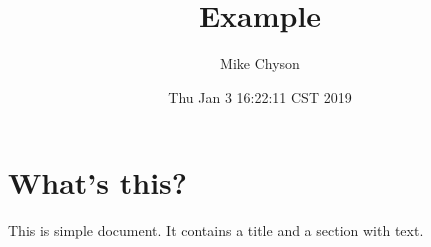 \documentclass[a4paper,11pt]{article}
\begin{document}
\title{Example}
\author{Mike Chyson}
\date{Thu Jan  3 16:22:11 CST 2019}
\maketitle
\section{What's this?}
This is simple document. It contains a title and a section with text.
\end{document}

